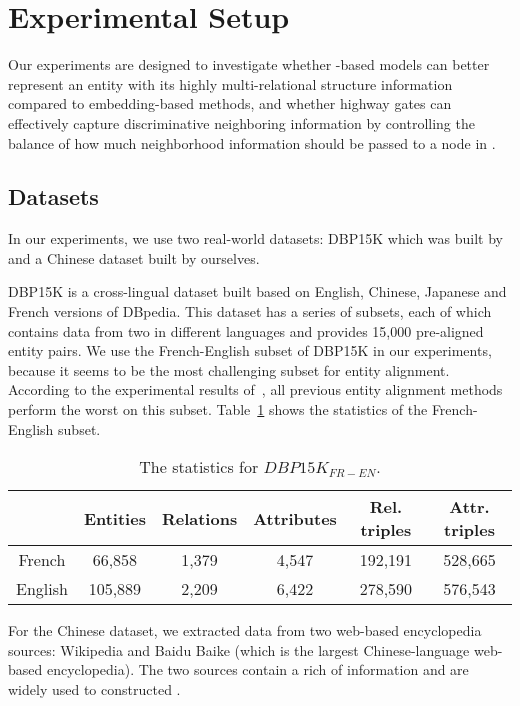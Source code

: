 \section{Experimental Setup}
	Our experiments are designed to investigate whether \RGCN-based models can better represent an entity with its highly multi-relational
structure information compared to \KG embedding-based methods, and whether highway gates can effectively capture discriminative neighboring
information by controlling the balance of how much neighborhood information should be passed to a node in \RGCN.

\subsection{Datasets}
\label{subsection:datasets}
	In our experiments, we use two real-world datasets: DBP15K which was built by~\cite{sun2017cross} and a Chinese dataset built by ourselves. 
	
	DBP15K is a cross-lingual dataset built based on English, Chinese, Japanese and French versions of DBpedia. 
	This dataset has a series of subsets, each of which contains data from two \KGs in different languages and provides 15,000 pre-aligned entity pairs. 
	We use the French-English subset of DBP15K in our experiments, because it seems to be the most challenging subset for entity alignment. 
	According to the experimental results of~\cite{sun2017cross}, all previous entity alignment methods perform the worst on this subset. Table~\ref{dbp} shows the statistics of the French-English subset.
	
		\begin{table}
		\centering
		\scriptsize
		\begin{tabular}{cccccc}
			\toprule
			&\bf  Entities &\bf  Relations &\bf  Attributes &\bf  Rel. triples &\bf  Attr. triples \\
			\midrule
			French & 66,858 & 1,379 & 4,547 & 192,191 & 528,665 \\ 
			English & 105,889 & 2,209 & 6,422 & 278,590 & 576,543 \\
			\bottomrule
		\end{tabular}
		\caption{The statistics for $DBP15K_{FR-EN}$.}
		\label{dbp}
	\end{table}
	
    For the Chinese dataset, we extracted data from two web-based encyclopedia sources: Wikipedia and Baidu Baike (which is the largest Chinese-language web-based encyclopedia). 
    The two sources contain a rich of information and are widely used to constructed \KGs.
	
